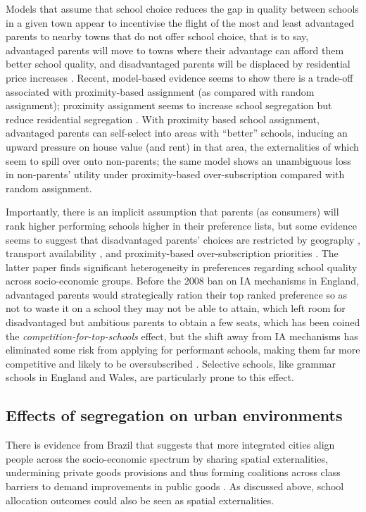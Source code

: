 \documentclass{article}
\begin{document}
\begin{multicols}{2}
Models that assume that school choice reduces the gap in quality between schools in a given town appear to incentivise the flight of the most and least advantaged parents to nearby towns that do not offer school choice, that is to say, advantaged parents will move to towns where their advantage can afford them better school quality, and disadvantaged parents will be displaced by residential price increases \cite{averyDistributionalConsequencesPublic2021}. Recent, model-based evidence seems to show there is a trade-off associated with proximity-based assignment (as compared with random assignment); proximity assignment seems to increase school segregation but reduce residential segregation \cite{greavesSchoolChoiceNeighborhood2024}. With proximity based school assignment, advantaged parents can self-select into areas with ``better'' schools, inducing an upward pressure on house value (and rent) in that area, the externalities of which seem to spill over onto non-parents; the same model shows an unambiguous loss in non-parents' utility under proximity-based over-subscription compared with random assignment.

Importantly, there is an implicit assumption that parents (as consumers) will rank higher performing schools higher in their preference lists, but some evidence seems to suggest that disadvantaged parents' choices are restricted by geography \cite{edwardsJustOutReach2021}, transport availability \cite{trajkovskiSchoolBusesMake2021}, and proximity-based over-subscription priorities \cite{burgessWhatParentsWant2015}. The latter paper finds significant heterogeneity in preferences regarding school quality across socio-economic groups. Before the 2008 ban on IA mechanisms in England, advantaged parents would strategically ration their top ranked preference so as not to waste it on a school they may not be able to attain, which left room for disadvantaged but ambitious parents to obtain a few seats, which has been coined the \textit{competition-for-top-schools} effect, but the shift away from IA mechanisms has eliminated some risk from applying for performant schools, making them far more competitive and likely to be oversubscribed \cite{pathakSchoolAdmissionsReform2013}. Selective schools, like grammar schools in England and Wales, are particularly prone to this effect.

\subsection{Effects of segregation on urban environments}
There is evidence from Brazil that suggests that more integrated cities align people across the socio-economic spectrum by sharing spatial externalities, undermining private goods provisions and thus forming coalitions across class barriers to demand improvements in public goods \cite{xuSegregationSpatialExternalities2024}. As discussed above, school allocation outcomes could also be seen as spatial externalities.


\end{multicols}
\end{document}
